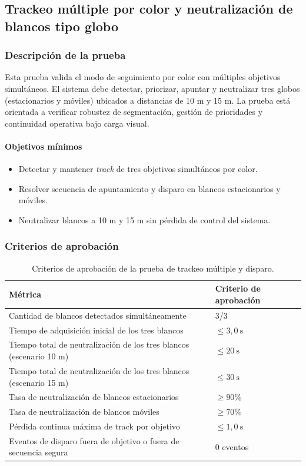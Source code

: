 \subsection{Trackeo múltiple por color y neutralización de blancos tipo globo}

\subsubsection{Descripción de la prueba}

Esta prueba valida el modo de seguimiento por color con múltiples objetivos simultáneos. El sistema debe detectar, priorizar, apuntar y neutralizar tres globos (estacionarios y móviles) ubicados a distancias de 10 m y 15 m. La prueba está orientada a verificar robustez de segmentación, gestión de prioridades y continuidad operativa bajo carga visual.

\paragraph{Objetivos mínimos}
\begin{itemize}
    \item Detectar y mantener \textit{track} de tres objetivos simultáneos por color.
    \item Resolver secuencia de apuntamiento y disparo en blancos estacionarios y móviles.
    \item Neutralizar blancos a 10 m y 15 m sin pérdida de control del sistema.
\end{itemize}

\subsubsection{Criterios de aprobación}

\begin{table}[H]
\centering
\small
\begin{tabular}{p{8.8cm} p{4.1cm}}
\toprule
\textbf{Métrica} & \textbf{Criterio de aprobación} \\
\midrule
Cantidad de blancos detectados simultáneamente & 3/3 \\
Tiempo de adquisición inicial de los tres blancos & $\leq 3{,}0\ \text{s}$ \\
Tiempo total de neutralización de los tres blancos (escenario 10 m) & $\leq 20\ \text{s}$ \\
Tiempo total de neutralización de los tres blancos (escenario 15 m) & $\leq 30\ \text{s}$ \\
Tasa de neutralización de blancos estacionarios & $\geq 90\%$ \\
Tasa de neutralización de blancos móviles & $\geq 70\%$ \\
Pérdida continua máxima de track por objetivo & $\leq 1{,}0\ \text{s}$ \\
Eventos de disparo fuera de objetivo o fuera de secuencia segura & 0 eventos \\
\bottomrule
\end{tabular}
\caption{Criterios de aprobación de la prueba de trackeo múltiple y disparo.}
\label{tab:criterios_prueba_trackeo_multiple}
\end{table}

